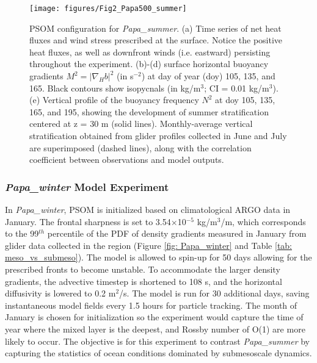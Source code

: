 \documentclass[draft,linenumbers]{agujournal2018}
\begin{document}
\begin{figure}[t]
	\texttt{[image: figures/Fig2\_Papa500\_summer]}
	\caption{PSOM configuration for \textit{Papa\_summer}. (a) Time series of net heat fluxes and wind stress prescribed at the surface. Notice the positive heat fluxes, as well as downfront winds (i.e. eastward) persisting throughout the experiment. (b)-(d) surface horizontal buoyancy gradients $M^2 = |\nabla_Hb|^2$ (in s$^{-2}$) at day of year (doy) 105, 135, and 165. Black contours show isopycnals (in kg/m$^3$; CI = 0.01 kg/m$^3$). (e) Vertical profile of the buoyancy frequency $N^2$ at doy 105, 135, 165, and 195, showing the development of summer stratification centered at z = 30 m (solid lines). Monthly-average vertical stratification obtained from glider profiles collected in June and July are superimposed (dashed lines), along with the correlation coefficient between observations and model outputs.}
	\label{fig: Papa_summer}
\end{figure} 


\subsubsection{\textit{Papa\_winter} Model Experiment}

In \textit{Papa\_winter}, PSOM is initialized based on climatological ARGO data in January. The frontal sharpness is set to 3.54$\times$10$^{-5}$ kg/m$^3$/m, which corresponds to the 99$^{th}$ percentile of the PDF of density gradients measured in January from glider data collected in the region (Figure \ref{fig: Papa_winter} and Table \ref{tab: meso_vs_submeso}). The model is allowed to spin-up for 50 days allowing for the prescribed fronts to become unstable. To accommodate the larger density gradients, the advective timestep is shortened to 108 s, and the horizontal diffusivity is lowered to 0.2 m$^2$/s. The model is run for 30 additional days, saving instantaneous model fields every 1.5 hours for particle tracking. The month of January is chosen for initialization so the experiment would capture the time of year where the mixed layer is the deepest, and Rossby number of O(1) are more likely to occur. The objective is for this experiment to contrast \textit{Papa\_summer} by capturing the statistics of ocean conditions dominated by submesoscale dynamics.
\end{document}
